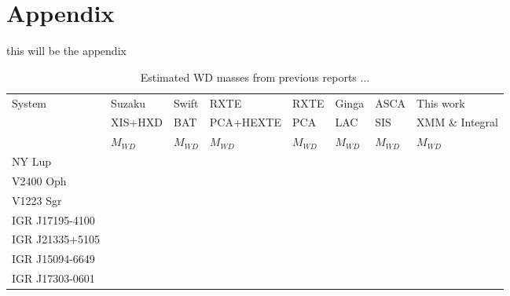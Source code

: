 \documentclass[oneside,a4paper,11pt]{report}
\begin{document}
\nocite{2004bhwd.book.....S}
\nocite{2009A&A...496..121B}
\nocite{accpower:1}
\nocite{2005A&A...435..191S}
\nocite{2008A&A...489.1121R}
\nocite{2010A&A...520A..25Y}
\nocite{warner:1}
\nocite{2006A&A...450..117S}
\nocite{rybicki:1}
\nocite{1973PThPh..49.1184A_aizu}
\nocite{astrop_techniques_5th}
\nocite{xray_hanbook}
\nocite{1972ApJ...175..417N}
\nocite{kleczek}
\nocite{comp_obj1}
\nocite{1939MNRAS..99..673C}
\nocite{2012MNRAS.419..336M}




\clearpage

\appendix
\section*{Appendix}
this will be the appendix



\begin{table}
\begin{center}
 

\caption{Estimated WD masses from previous reports ...}
\begin{tabular}{llllllll}
\hline
\hline
System & Suzaku & Swift & RXTE & RXTE & Ginga & ASCA& This work  \\
       & XIS+HXD & BAT& PCA+HEXTE & PCA & LAC & SIS & XMM \& Integral                     \\
       & $M_{WD}$ &$M_{WD}$ &$M_{WD} $&$M_{WD}$ &$M_{WD}$ &$M_{WD}$ &$M_{WD}$ \\
\hline
 NY Lup&         &        &          &     &      &         &           \\
 V2400 Oph&         &        &          &     &      &         &           \\
 V1223 Sgr&         &        &          &     &      &         &           \\
 IGR J17195-4100&         &        &          &     &      &         &           \\
 IGR J21335+5105&         &        &          &     &      &         &           \\
 IGR J15094-6649&         &        &          &     &      &         &           \\
 IGR J17303-0601&         &        &          &     &      &         &           \\

\hline
\end{tabular}

\end{center}
\end{table}
\end{document}
